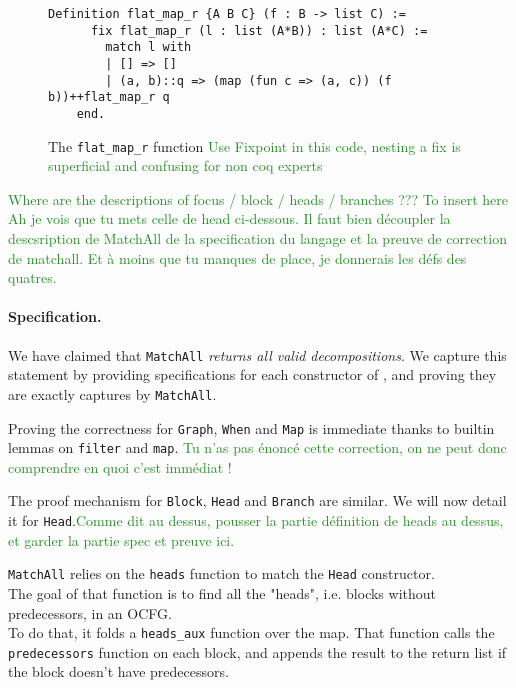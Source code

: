 \documentclass[11pt]{article}
\newcommand{\inlinecoq}[1]{\mbox{\lstinline[style=customcoq,columns=fixed,basewidth=.48em]{#1}}}
\newcommand{\ilc}[1]{\inlinecoq{#1}}
\newcommand{\yz}[1]{\textcolor{ForestGreen}{#1}}
\newcommand{\yzt}[1]{\textcolor{ForestGreen!50}{#1}}
\begin{document}
\begin{figure}[h]
  \label{fig:fmapr}
  \begin{lstlisting}[style=customcoq,basicstyle=\small\ttfamily]
    Definition flat_map_r {A B C} (f : B -> list C) :=
      fix flat_map_r (l : list (A*B)) : list (A*C) :=
        match l with
        | [] => []
        | (a, b)::q => (map (fun c => (a, c)) (f b))++flat_map_r q
    end.
  \end{lstlisting}
  \caption{The \ilc{flat_map_r} function \yz{Use Fixpoint in this code, nesting a fix is superficial and confusing for non coq experts}}
  \label{fig:flatmap}
\end{figure}

\yz{Where are the descriptions of focus / block / heads / branches ??? To insert here}
\yz{Ah je vois que tu mets celle de head ci-dessous. Il faut bien découpler la descsription de MatchAll de la specification du langage et la preuve de correction de matchall. Et à moins que tu manques de place, je donnerais les défs des quatres.}

\paragraph*{Specification.}
\yzt{We have claimed that \ilc{MatchAll} \emph{returns all valid decompositions}. We capture this statement by providing specifications for each constructor of \pat, and proving they are exactly captures by \ilc{MatchAll}.}

Proving the correctness for \ilc{Graph}, \ilc{When} and \ilc{Map} is immediate thanks to builtin lemmas on \ilc{filter} and \ilc{map}. \yz{Tu n'as pas énoncé cette correction, on ne peut donc comprendre en quoi c'est immédiat !}

The proof mechanism for \ilc{Block}, \ilc{Head} and \ilc{Branch} are similar. We will now detail it for \ilc{Head}.\yz{Comme dit au dessus, pousser la partie définition de heads au dessus, et garder la partie spec et preuve ici.}

\ilc{MatchAll} relies on the \ilc{heads} function to match the \ilc{Head} constructor.\\
The goal of that function is to find all the "heads", i.e. blocks without predecessors, in an OCFG.\\
To do that, it folds a \ilc{heads_aux} function over the map. That function calls the \ilc{predecessors} function on each block, and appends the result to the return list if the block doesn't have predecessors.
\end{document}
